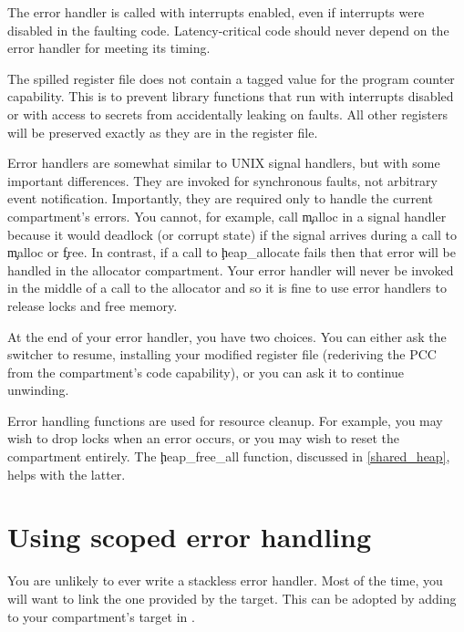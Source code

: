 
\begin{warning}
The error handler is called with interrupts enabled, even if interrupts were disabled in the faulting code.
Latency-critical code should never depend on the error handler for meeting its timing.
\end{warning}

The spilled register file does not contain a tagged value for the program counter capability.
This is to prevent library functions that run with interrupts disabled or with access to secrets from accidentally leaking on faults.
All other registers will be preserved exactly as they are in the register file.

\begin{note}
Error handlers are somewhat similar to UNIX signal handlers, but with some important differences.
They are invoked for synchronous faults, not arbitrary event notification.
Importantly, they are required only to handle the current compartment's errors.
You cannot, for example, call \c{malloc} in a signal handler because it would deadlock (or corrupt state) if the signal arrives during a call to \c{malloc} or \c{free}.
In contrast, if a call to \c{heap_allocate} fails then that error will be handled in the allocator compartment.
Your error handler will never be invoked in the middle of a call to the allocator and so it is fine to use error handlers to release locks and free memory.
\end{note}

At the end of your error handler, you have two choices.
You can either ask the switcher to resume, installing your modified register file (rederiving the PCC from the compartment's code capability), or you can ask it to continue unwinding.

Error handling functions are used for resource cleanup.
For example, you may wish to drop locks when an error occurs, or you may wish to reset the compartment entirely.
The \c{heap_free_all} function, discussed in \ref{shared_heap}, helps with the latter.

\section{Using scoped error handling}

You are unlikely to ever write a stackless error handler.
Most of the time, you will want to link the one provided by the  target.
This can be adopted by adding  to your compartment's target in .

